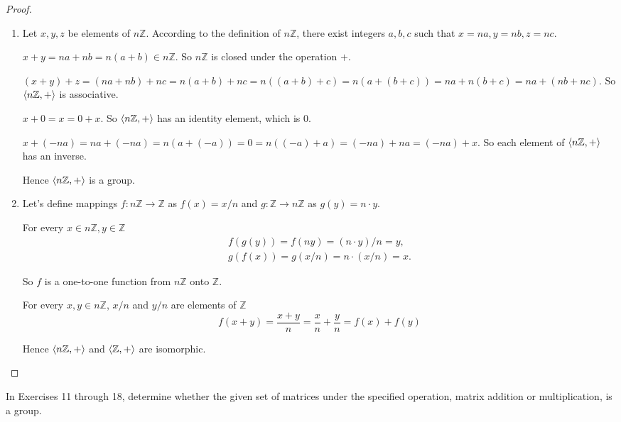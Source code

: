 \begin{proof}
    \begin{enumerate}[label={\textbf{\alph*.}}]
        \item Let $x, y, z$ be elements of $n\mathbb{Z}$. According to the definition of $n\mathbb{Z}$, there exist integers $a, b, c$ such that $x = na, y = nb, z = nc$.

              $x + y = na + nb = n(a + b)\in n\mathbb{Z}$. So $n\mathbb{Z}$ is closed under the operation $+$.

              $(x + y) + z = (na + nb) + nc = n(a + b) + nc = n((a + b) + c) = n(a + (b + c)) = na + n(b + c) = na + (nb + nc)$. So $\left\langle{n\mathbb{Z}, +}\right\rangle$ is associative.

              $x + 0 = x = 0 + x$. So $\left\langle{n\mathbb{Z}, +}\right\rangle$ has an identity element, which is $0$.

              $x + (-na) = na + (-na) = n (a + (-a)) = 0 = n ((-a) + a) = (-na) + na = (-na) + x$. So each element of $\left\langle{n\mathbb{Z}, +}\right\rangle$ has an inverse.

              Hence $\left\langle{n\mathbb{Z}, +}\right\rangle$ is a group.
        \item Let's define mappings $f: n\mathbb{Z} \to \mathbb{Z}$ as $f(x) = x/n$ and $g: \mathbb{Z} \to n\mathbb{Z}$ as $g(y) = n\cdot y$.

              For every $x\in n\mathbb{Z}, y\in\mathbb{Z}$
              \[
                  \begin{split}
                      f(g(y)) = f(ny) = (n\cdot y)/n = y, \\
                      g(f(x)) = g(x/n) = n\cdot (x/n) = x.
                  \end{split}
              \]

              So $f$ is a one-to-one function from $n\mathbb{Z}$ onto $\mathbb{Z}$.

              For every $x, y\in n\mathbb{Z}$, $x/n$ and $y/n$ are elements of $\mathbb{Z}$
              \[
                  f(x + y) = \frac{x + y}{n} = \frac{x}{n} + \frac{y}{n} = f(x) + f(y)
              \]

              Hence $\left\langle{n\mathbb{Z}, +}\right\rangle$ and $\left\langle{\mathbb{Z}, +}\right\rangle$ are isomorphic.
    \end{enumerate}
\end{proof}

In Exercises 11 through 18, determine whether the given set of matrices under the specified operation, matrix addition or multiplication, is a group.

